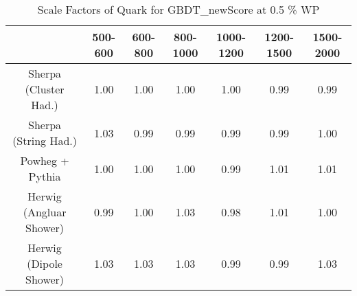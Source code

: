 \begin{table}
\centering
\caption{Scale Factors of Quark for GBDT_newScore at 0.5 \% WP}
\label{tab:SF_MC_GBDT_newScore_0.5_Quark}
\begin{tabular}{ccccccc}
\toprule
{} &  500-600 &  600-800 &  800-1000 &  1000-1200 &  1200-1500 &  1500-2000 \\
\midrule
Sherpa (Cluster Had.)   &     1.00 &     1.00 &      1.00 &       1.00 &       0.99 &       0.99 \\
Sherpa (String Had.)    &     1.03 &     0.99 &      0.99 &       0.99 &       0.99 &       1.00 \\
Powheg + Pythia         &     1.00 &     1.00 &      1.00 &       0.99 &       1.01 &       1.01 \\
Herwig (Angluar Shower) &     0.99 &     1.00 &      1.03 &       0.98 &       1.01 &       1.00 \\
Herwig (Dipole Shower)  &     1.03 &     1.03 &      1.03 &       0.99 &       0.99 &       1.03 \\
\bottomrule
\end{tabular}
\end{table}
